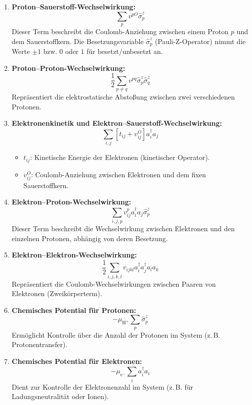 \documentclass[12pt]{article}
\begin{document}
	\begin{enumerate}[label=\textbf{(\arabic*)}, leftmargin=1.5cm]
		\item \textbf{Proton–Sauerstoff-Wechselwirkung:}
		\[
		\sum_p v^{pO} \hat{\sigma}_p^z
		\]
		Dieser Term beschreibt die Coulomb-Anziehung zwischen einem Proton $p$ und dem Sauerstoffkern. Die Besetzungsvariable $\hat{\sigma}_p^z$ (Pauli-Z-Operator) nimmt die Werte $\pm1$ bzw. $0$ oder $1$ für besetzt/unbesetzt an.
		
		\item \textbf{Proton–Proton-Wechselwirkung:}
		\[
		\frac{1}{2} \sum_{p \neq q} v^{pq} \hat{\sigma}_p^z \hat{\sigma}_q^z
		\]
		Repräsentiert die elektrostatische Abstoßung zwischen zwei verschiedenen Protonen.
		
		\item \textbf{Elektronenkinetik und Elektron–Sauerstoff-Wechselwirkung:}
		\[
		\sum_{i,j} \left[t_{ij} + v_{ij}^O \right] a_i^\dagger a_j
		\]
		\begin{itemize}
			\item $t_{ij}$: Kinetische Energie der Elektronen (kinetischer Operator).
			\item $v_{ij}^O$: Coulomb-Anziehung zwischen Elektronen und dem fixen Sauerstoffkern.
		\end{itemize}
		
		\item \textbf{Elektron–Proton-Wechselwirkung:}
		\[
		\sum_{i,j,p} v_{ij}^p a_i^\dagger a_j \hat{\sigma}_p^z
		\]
		Dieser Term beschreibt die Wechselwirkung zwischen Elektronen und den einzelnen Protonen, abhängig von deren Besetzung.
		
		\item \textbf{Elektron–Elektron-Wechselwirkung:}
		\[
		\frac{1}{2} \sum_{i,j,k,l} v_{ijkl} a_i^\dagger a_j^\dagger a_l a_k
		\]
		Repräsentiert die Coulomb-Wechselwirkungen zwischen Paaren von Elektronen (Zweikörperterm).
		
		\item \textbf{Chemisches Potential für Protonen:}
		\[
		- \mu_{\mathrm{H}^{+}} \sum_p \hat{\sigma}_p^z
		\]
		Ermöglicht Kontrolle über die Anzahl der Protonen im System (z.\,B. Protonentransfer).
		
		\item \textbf{Chemisches Potential für Elektronen:}
		\[
		- \mu_{\mathrm{e}^{-}} \sum_i a_i^\dagger a_i
		\]
		Dient zur Kontrolle der Elektronenzahl im System (z.\,B. für Ladungsneutralität oder Ionen).
	\end{enumerate}
	
\end{document}
